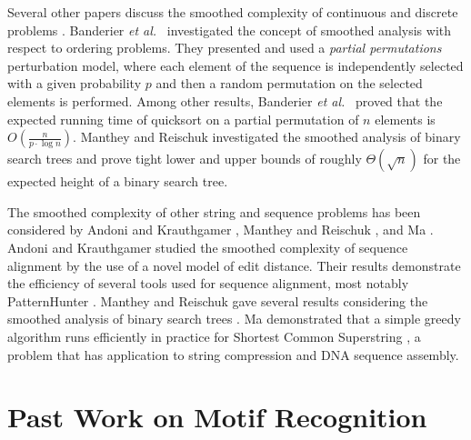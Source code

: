 Several other papers discuss the smoothed complexity of continuous and discrete problems \cite{BD02,DDM03,Ma08}.  Banderier {\em et al.}\ \cite{DDM03} investigated the concept of smoothed analysis with respect to ordering problems.  They presented and used a {\em partial permutations} perturbation model, where each element of the sequence is independently selected with a given probability $p$ and then a random permutation on the selected elements is performed.  Among other results,  Banderier {\em et al.}\ \cite{DDM03} proved that the expected running time of quicksort on a partial permutation of $n$  elements is $O\left(\frac{n}{p \cdot \log n} \right)$. Manthey and Reischuk investigated the smoothed analysis of binary search trees and prove tight lower and upper bounds of roughly $\Theta(\sqrt{n})$ for the expected height of a binary search tree. 

The smoothed complexity of other string and sequence problems has been considered by Andoni and Krauthgamer \cite{AK}, Manthey and Reischuk \cite{MR05}, and Ma \cite{Ma08}.  Andoni and Krauthgamer \cite{AK} studied the smoothed complexity of sequence alignment by the use of a novel model of edit distance. Their results demonstrate the efficiency of several tools used for sequence alignment, most notably PatternHunter \cite{MTL}. Manthey and Reischuk gave several results considering the smoothed analysis of binary search trees \cite{MR05}.  Ma demonstrated that a simple greedy algorithm runs efficiently in practice for {\sc Shortest Common Superstring} \cite{Ma08}, a problem that has application to string compression and DNA sequence assembly.

\section{Past Work on Motif Recognition}

